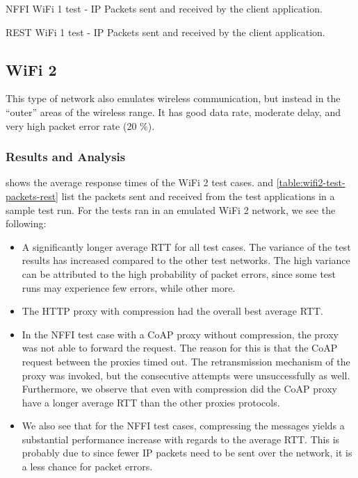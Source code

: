 \begin{table}[h]

\caption{NFFI WiFi 1 test - IP Packets sent and received by the client application.}
\label{table:wifi1-test-packets-nffi}
\end{table}

\begin{table}[h]

\caption{REST WiFi 1 test - IP Packets sent and received by the client application.}
\label{table:wifi1-test-packets-rest}
\end{table}


\subsection{WiFi 2}

This type of network also emulates wireless communication, but instead in the
``outer'' areas of the wireless range. It has good data rate, moderate delay,
and very high packet error rate (20 \%).


\subsubsection{Results and Analysis}

 shows the average response times of the WiFi 2 test
cases.  and
\cref{table:wifi2-test-packets-rest} list the packets sent and received from the
test applications in a sample test run. For the tests ran in an emulated WiFi 2
network, we see the following:

\begin{itemize}

    \item A significantly longer average RTT for all test cases. The variance of
    the test results has increased compared to the other test networks. The high
    variance can be attributed to the high probability of packet errors, since
    some test runs may experience few errors, while other more.

    \item The HTTP proxy with compression had the overall best average
    RTT.

    \item In the NFFI test case with a CoAP proxy without compression, the proxy
    was not able to forward the request. The reason for this is that the CoAP
    request between the proxies timed out. The retransmission mechanism of the
    proxy was invoked, but the consecutive attempts were unsuccessfully as well.
    Furthermore, we observe that even with compression did the CoAP proxy have a longer
    average RTT than the other proxies protocols.

    \item We also see that for the NFFI test cases, compressing the messages
    yields a substantial performance increase with regards to the average RTT.
    This is probably due to since fewer IP packets need to be sent over the
    network, it is a less chance for packet errors.

\end{itemize}


